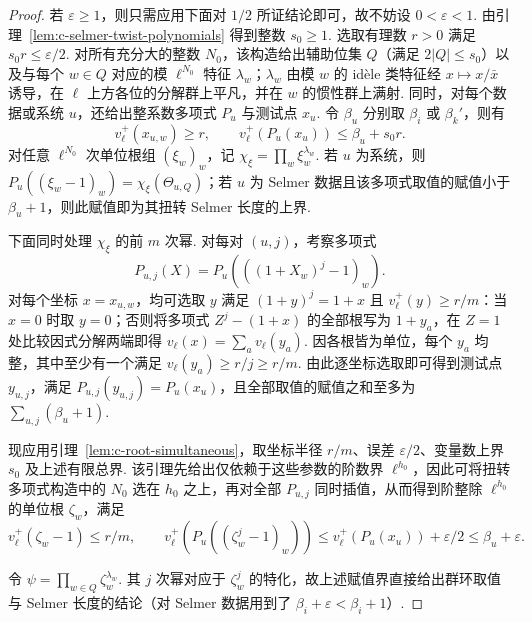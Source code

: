 \begin{proof}
若 $\varepsilon\ge1$，则只需应用下面对 $1/2$ 所证结论即可，故不妨设 $0<\varepsilon<1$.
由引理~\ref{lem:c-selmer-twist-polynomials} 得到整数 $s_0\ge1$. 选取有理数 $r>0$ 满足 $s_0r\le\varepsilon/2$. 对所有充分大的整数 $N_0$，该构造给出辅助位集 $Q$（满足 $2|Q|\le s_0$）以及与每个 $w\in Q$ 对应的模 $\ell^{N_0}$ 特征 $\lambda_w$；$\lambda_w$ 由模 $w$ 的 idèle 类特征经 $x\mapsto x/\bar x$ 诱导，在 $\ell$ 上方各位的分解群上平凡，并在 $w$ 的惯性群上满射. 同时，对每个数据或系统 $u$，还给出整系数多项式 $P_u$ 与测试点 $x_u$. 令 $\beta_u$ 分别取 $\beta_i$ 或 $\beta_k'$，则有
\[
 v_\ell^+(x_{u,w})\ge r,\qquad
 v_\ell^+(P_u(x_u))\le\beta_u+s_0r.
\]
对任意 $\ell^{N_0}$ 次单位根组 $(\xi_w)_w$，记 $\chi_\xi=\prod_w \xi_w^{\lambda_w}$. 若 $u$ 为系统，则
$P_u((\xi_w-1)_w)=\chi_\xi(\Theta_{u,Q})$；若 $u$ 为 Selmer 数据且该多项式取值的赋值小于 $\beta_u+1$，则此赋值即为其扭转 Selmer 长度的上界.

下面同时处理 $\chi_\xi$ 的前 $m$ 次幂. 对每对 $(u,j)$，考察多项式
\[
 P_{u,j}(X)=P_u(((1+X_w)^j-1)_w).
\]
对每个坐标 $x=x_{u,w}$，均可选取 $y$ 满足 $(1+y)^j=1+x$ 且 $v_\ell^+(y)\ge r/m$：当 $x=0$ 时取 $y=0$；否则将多项式 $Z^j-(1+x)$ 的全部根写为 $1+y_a$，在 $Z=1$ 处比较因式分解两端即得 $v_\ell(x)=\sum_a v_\ell(y_a)$. 因各根皆为单位，每个 $y_a$ 均整，其中至少有一个满足 $v_\ell(y_a)\ge r/j\ge r/m$.
由此逐坐标选取即可得到测试点 $y_{u,j}$，满足 $P_{u,j}(y_{u,j})=P_u(x_u)$，且全部取值的赋值之和至多为 $\sum_{u,j}(\beta_u+1)$.

现应用引理~\ref{lem:c-root-simultaneous}，取坐标半径 $r/m$、误差 $\varepsilon/2$、变量数上界 $s_0$ 及上述有限总界. 该引理先给出仅依赖于这些参数的阶数界 $\ell^{h_0}$，因此可将扭转多项式构造中的 $N_0$ 选在 $h_0$ 之上，再对全部 $P_{u,j}$ 同时插值，从而得到阶整除 $\ell^{h_0}$ 的单位根 $\zeta_w$，满足
\[
 v_\ell^+(\zeta_w-1)\le r/m,\qquad
 v_\ell^+(P_u((\zeta_w^j-1)_w))
 \le v_\ell^+(P_u(x_u))+\varepsilon/2
 \le\beta_u+\varepsilon.
\]

令 $\psi=\prod_{w\in Q}\zeta_w^{\lambda_w}$. 其 $j$ 次幂对应于 $\zeta_w^j$ 的特化，故上述赋值界直接给出群环取值与 Selmer 长度的结论（对 Selmer 数据用到了 $\beta_i+\varepsilon<\beta_i+1$）.


\end{proof}
